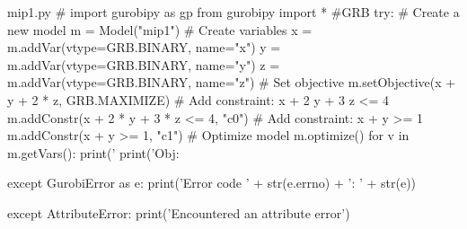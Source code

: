 \documentclass[bwprint]{gmcmthesis}
\begin{document}
\begin{appendices}
\begin{Python}{mip1.py}
        # import gurobipy as gp
        from gurobipy import * #GRB
        try:
            # Create a new model
            m = Model("mip1")
            # Create variables
            x = m.addVar(vtype=GRB.BINARY, name="x")
            y = m.addVar(vtype=GRB.BINARY, name="y")
            z = m.addVar(vtype=GRB.BINARY, name="z")
            # Set objective
            m.setObjective(x + y + 2 * z, GRB.MAXIMIZE)
            # Add constraint: x + 2 y + 3 z <= 4
            m.addConstr(x + 2 * y + 3 * z <= 4, "c0")
            # Add constraint: x + y >= 1
            m.addConstr(x + y >= 1, "c1")
            # Optimize model
            m.optimize()
            for v in m.getVars():
                print('%
            print('Obj: %
        
        except GurobiError as e:
            print('Error code ' + str(e.errno) + ': ' + str(e))
        
        except AttributeError:
            print('Encountered an attribute error')
        \end{Python}
    
\end{appendices}
\end{document}
